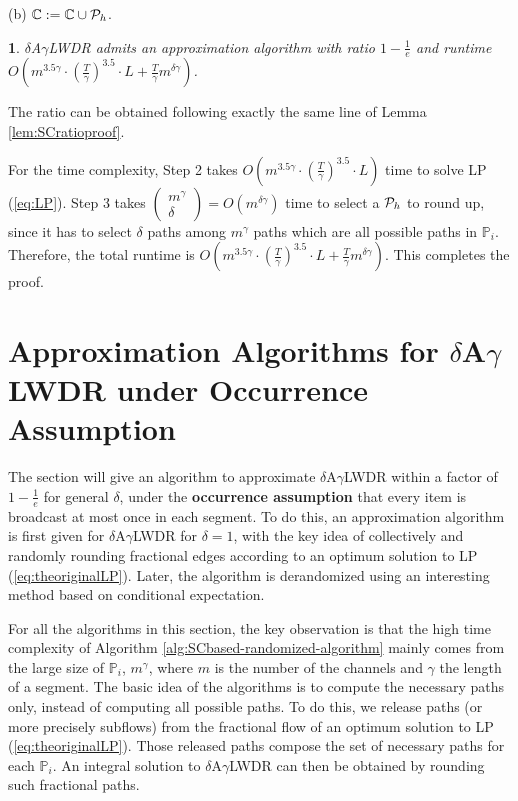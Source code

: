 \documentclass[11pt,english,onecolumn,draftcls]{IEEEtran}
\theoremstyle{plain}
\theoremstyle{plain}
\theoremstyle{plain}
\newtheorem{lem}[thm]{\protect\lemmaname}
\theoremstyle{plain}
\providecommand{\lemmaname}{Lemma}
\begin{document}
\quad{}(b) $\mathbb{C}:=\mathbb{C}\cup\mathbb{{\cal P}}_{h}$.
\begin{lem}
\label{lem:aArLWDRratioandtime}$\delta$A$\gamma$LWDR admits an
approximation algorithm with ratio $1-\frac{1}{e}$ and runtime $O(m^{3.5\gamma}\cdot(\frac{T}{\gamma})^{3.5}\cdot L+\frac{T}{\gamma}m^{\delta\gamma})$.\end{lem}
\begin{IEEEproof}
The ratio can be obtained following exactly the same line of Lemma
\ref{lem:SCratioproof}.

For the time complexity, Step 2 takes $O(m^{3.5\gamma}\cdot(\frac{T}{\gamma})^{3.5}\cdot L)$
time to solve LP (\ref{eq:LP}). Step 3 takes $\left(\begin{array}{c}
m^{\gamma}\\
\delta
\end{array}\right)=O(m^{\delta\gamma})$ time to select a ${\cal P}_{h}$ to round up, since it has to select
$\delta$ paths among $m^{\gamma}$ paths which are all possible paths
in $\mathbb{P}_{i}$. Therefore, the total runtime is $O(m^{3.5\gamma}\cdot(\frac{T}{\gamma})^{3.5}\cdot L+\frac{T}{\gamma}m^{\delta\gamma})$.
This completes the proof.
\end{IEEEproof}

\section{Approximation Algorithms for $\delta$A$\gamma$LWDR under Occurrence
Assumption}

The section will give an algorithm to approximate $\delta$A$\gamma$LWDR
within a factor of $1-\frac{1}{e}$ for general $\delta$, under the
\textbf{occurrence assumption} that every item is broadcast at most
once in each segment. To do this, an approximation algorithm is first
given for $\delta$A$\gamma$LWDR for $\delta=1$, with the key idea
of collectively and randomly rounding fractional edges according to
an optimum solution to LP (\ref{eq:theoriginalLP}). Later, the algorithm
is derandomized using an interesting method based on conditional expectation.

For all the algorithms in this section, the key observation is that
the high time complexity of Algorithm \ref{alg:SCbased-randomized-algorithm}
mainly comes from the large size of $\mathbb{P}_{i}$, $m^{\gamma}$,
where $m$ is the number of the channels and $\gamma$ the length
of a segment. The basic idea of the algorithms is to compute the necessary
paths only, instead of computing all possible paths. To do this, we
release paths (or more precisely subflows) from the fractional flow
of an optimum solution to LP (\ref{eq:theoriginalLP}). Those released
paths compose the set of necessary paths for each $\mathbb{P}_{i}$.
An integral solution to $\delta$A$\gamma$LWDR can then be obtained
by rounding such fractional paths.
\end{document}
